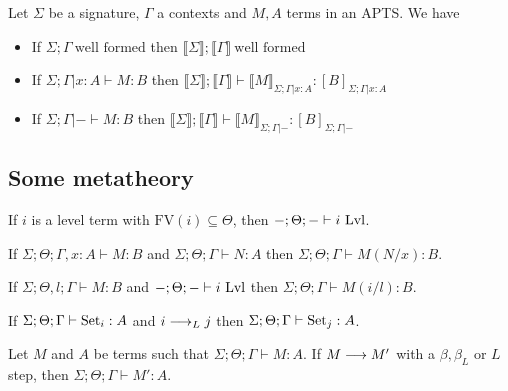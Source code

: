 \documentclass[]{StandardTemplate}
\begin{document}
\begin{thm}[Soundness]
  Let $ \Sigma $ be a signature, $ \Gamma $ a contexts and $ M, A $ terms in an APTS. We have
  \begin{itemize}
  \item If $ \Sigma; \Gamma~\text{well formed} $ then  $ \llbracket \Sigma  \rrbracket; \llbracket  \Gamma  \rrbracket~\text{well formed} $
  \item If $  \Sigma; \Gamma |x : A \vdash M : B  $ then $ \llbracket \Sigma \rrbracket; \llbracket \Gamma \rrbracket \vdash \llbracket M \rrbracket_{\Sigma; \Gamma |x : A} : [ B ]_{\Sigma; \Gamma |x : A}$
  \item If $  \Sigma; \Gamma |- \vdash M : B  $ then $ \llbracket \Sigma \rrbracket; \llbracket \Gamma \rrbracket \vdash \llbracket M \rrbracket_{\Sigma; \Gamma |-} : [ B ]_{\Sigma; \Gamma|-}$
  \end{itemize}
\end{thm}

\subsection{Some metatheory}
\label{subsec:meta}

\begin{lem}[]
If $ i $ is a level term with $ \text{FV}(i) \subseteq \Theta $, then $ -;\Theta;- \vdash i~\text{Lvl} $.
\end{lem}

\begin{lem}[]
If $ \Sigma; \Theta; \Gamma, x : A \vdash M : B $ and $\Sigma; \Theta; \Gamma \vdash N : A $ then $ \Sigma; \Theta; \Gamma\vdash M(N/x) : B $.
\end{lem}

\begin{lem}[]
If $ \Sigma; \Theta, l; \Gamma \vdash M : B $ and $-; \Theta; - \vdash i~\text{Lvl}$ then $ \Sigma; \Theta; \Gamma\vdash M(i/l) : B $.
\end{lem}

\begin{lem}[]
If $ \Sigma; \Theta; \Gamma \vdash \text{Set}_i : A $ and $ i \longrightarrow_L j$ then $ \Sigma; \Theta; \Gamma\vdash \text{Set}_j : A $.
\end{lem}


\begin{prop}[]
  Let $ M $ and $ A $ be terms such that $ \Sigma; \Theta; \Gamma \vdash M : A $. If $ M \longrightarrow M' $ with a $ \beta, \beta_L $ or $ L $ step, then $ \Sigma; \Theta; \Gamma \vdash M' : A $.
\end{prop}
\end{document}
